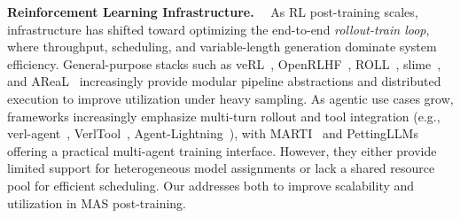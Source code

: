 \textbf{Reinforcement Learning Infrastructure.}~~
As RL post-training scales, infrastructure has shifted toward optimizing the end-to-end \emph{rollout-train loop}, where throughput, scheduling, and variable-length generation dominate system efficiency. General-purpose stacks such as veRL~\citep{sheng2024hybridflow}, OpenRLHF~\citep{hu2024openrlhf}, ROLL~\citep{wang2025reinforcement}, slime~\citep{slime_github}, and AReaL~\citep{fu2025areal} increasingly provide modular pipeline abstractions and distributed execution to improve utilization under heavy sampling. As agentic use cases grow, frameworks increasingly emphasize multi-turn rollout and tool integration (e.g., verl-agent~\citep{feng2025group}, VerlTool~\citep{jiang2025verltool}, Agent-Lightning~\citep{luo2025agent}), with MARTI~\citep{marti2025} and PettingLLMs~\citep{zhao2025stronger} offering a practical multi-agent training interface. However, they either provide limited support for heterogeneous model assignments or lack a shared resource pool for efficient scheduling. Our \methodname{} addresses both to improve scalability and utilization in MAS post-training.

